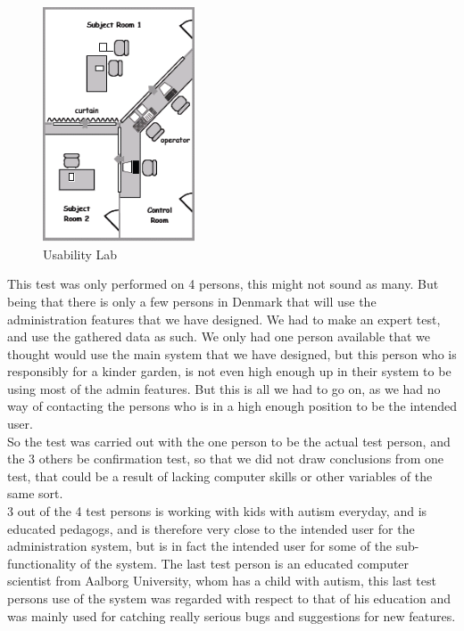 \begin{figure}[htbp]
	\centering
		\includegraphics[width=0.40\textwidth]{images/usabilitylab.png}
	\caption{Usability Lab}
	\label{fig:usabilitylab}
\end{figure}

This test was only performed on 4 persons, this might not sound as many. But being that there is only a few persons in Denmark that will use the administration features that we have designed. We had to make an expert test, and use the gathered data as such. We only had one person available that we thought would use the main system that we have designed, but this person who is responsibly for a kinder garden, is not even high enough up in their system to be using most of the admin features. But this is all we had to go on, as we had no way of contacting the persons who is in a high enough position to be the intended user.\\
So the test was carried out with the one person to be the actual test person, and the 3 others be confirmation test, so that we did not draw conclusions from one test, that could be a result of lacking computer skills or other variables of the same sort.\\
3 out of the 4 test persons is working with kids with autism everyday, and is educated pedagogs, and is therefore very close to the intended user for the administration system, but is in fact the intended user for some of the sub-functionality of the system. The last test person is an educated computer scientist from Aalborg University, whom has a child with autism, this last test persons use of the system was regarded with respect to that of his education and was mainly used for catching really serious bugs and suggestions for new features.\\
\\

